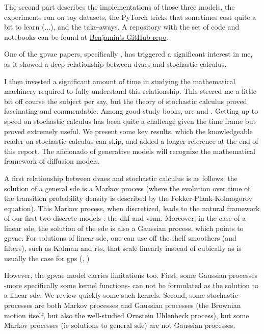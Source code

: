 The second part describes the implementations of those three models, the experiments run on toy datasets, the PyTorch tricks 
that sometimes cost quite a bit to learn (...), and the take-aways. A repository with the set of code and notebooks can be found 
at \href{https://github.com/BenjaminDeporte/MVA_Stage}{Benjamin's GitHub repo}.

One of the \gls{gpvae} papers, specifically \cite{zhu_markovian_2023}, has triggered a significant interest in me, as it showed a 
deep relationship between \glspl{dvae} and stochastic calculus.

I then invested a significant amount of time in studying the mathematical machinery required to fully understand this relationship. 
This steered me a little bit off course the subject per say, but the theory of stochastic calculus proved fascinating and commendable.
 Among good study books, are \cite{mouvement-brownien-calcul-ito} and \cite{sarkka_applied_2019}. Getting up to speed on stochastic calculus 
 has been quite a challenge given the time frame but proved extremely useful. We present some key results, which the knowledgeable reader 
 on stochastic calculus can skip, and added a longer reference at the end of this report. The aficionado of generative models will recognize 
the mathematical framework of diffusion models.

A first relationship between \glspl{dvae} and stochastic calculus is as follows: the solution of a general \gls{sde} is a Markov process (where 
the evolution over time of the transition probability density is described by the Fokker-Plank-Kolmogorov equation). This Markov process, 
when discretized, leads to the natural framework of our first two discrete models : the \gls{dkf} and \gls{vrnn}. Moreover, 
in the case of a linear \gls{sde}, the solution of the \gls{sde} is also a Gaussian process, which points to \gls{gpvae}. For solutions of linear \gls{sde}, 
one can use off the shelf smoothers (and filters), such as Kalman and \gls{rts}, that scale linearly instead of cubically as is usually the case 
for \glspl{gp} (\cite{zhu_markovian_2023}, \cite{sarkka_applied_2019})

However, the \gls{gpvae} model carries limitations too. First, some Gaussian processes -more specifically some kernel functions- 
can not be formulated as the solution to a linear \gls{sde}. We review quickly some such kernels. Second, some stochastic processes 
are both Markov processes and Gaussian processes (the Brownian motion itself, but also the well-studied Ornstein Uhlenbeck process), 
but some Markov processes (ie solutions to general \gls{sde}) are not Gaussian processes. 

